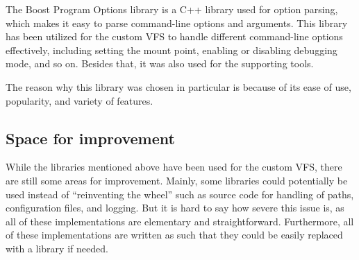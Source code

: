 The Boost Program Options library\cite{boost_program_options} is a C++ library used for option parsing, which makes it easy to parse command-line options and arguments.
This library has been utilized for the custom VFS to handle different command-line options effectively, including setting the mount point, enabling or disabling debugging mode, and so on.
Besides that, it was also used for the supporting tools.

The reason why this library was chosen in particular is because of its ease of use, popularity, and variety of features.

\subsection{Space for improvement}\label{subsec:libs-space-for-improvement}

While the libraries mentioned above have been used for the custom VFS, there are still some areas for improvement.
Mainly, some libraries could potentially be used instead of ``reinventing the wheel'' such as source code for handling of paths, configuration files, and logging.
But it is hard to say how severe this issue is, as all of these implementations are elementary and straightforward.
Furthermore, all of these implementations are written as such that they could be easily replaced with a library if needed.